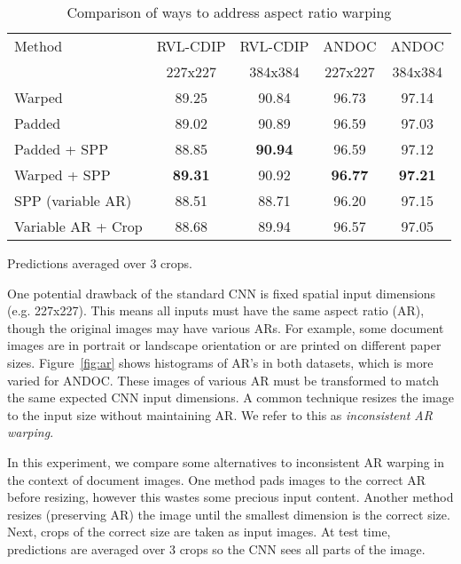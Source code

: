 \documentclass[10pt, conference, compsocconf]{IEEEtran}
\newcommand{\squeezeup}{\vspace{-2.5mm}}
\begin{document}
\begin{table}
\begin{tabular}{l|c|c|c|c}

Method            & RVL-CDIP & RVL-CDIP & ANDOC   & ANDOC    \\
                  & 227x227  & 384x384  & 227x227 & 384x384  \\
\hline
Warped            &  89.25   &  90.84   & 96.73   & 97.14    \\
Padded            &  89.02   &  90.89   & 96.59   & 97.03    \\
Padded + SPP      &  88.85   &  \textbf{90.94}   & 96.59   & 97.12   \\
Warped  + SPP     &  \textbf{89.31}   & 90.92   & \textbf{96.77}   & \textbf{97.21}    \\
SPP (variable AR) &  88.51   &  88.71   & 96.20   & 97.15   \\
Variable AR + Crop &  88.68   &  89.94   & 96.57   & 97.05    \\
\end{tabular}

 Predictions averaged over 3 crops.
\caption{Comparison of ways to address aspect ratio warping}
\label{tab:pad}
\squeezeup
\squeezeup
\end{table}


\label{sec:aspect_ratio}

One potential drawback of the standard CNN is fixed spatial input dimensions (e.g. 227x227).
This means all inputs must have the same aspect ratio (AR), though the original images may have various ARs.
For example, some document images are in portrait or landscape orientation or are printed on different paper sizes.
Figure~\ref{fig:ar} shows histograms of AR's in both datasets, which is more varied for ANDOC.
These images of various AR must be transformed to match the same expected CNN input dimensions.
A common technique resizes the image to the input size without maintaining AR.
We refer to this as \emph{inconsistent AR warping}.

In this experiment, we compare some alternatives to inconsistent AR warping in the context of document images.
One method pads images to the correct AR before resizing, however this wastes some precious input content.
Another method resizes (preserving AR) the image until the smallest dimension is the correct size.
Next, crops of the correct size are taken as input images.
At test time, predictions are averaged over 3 crops so the CNN sees all parts of the image.
\end{document}
